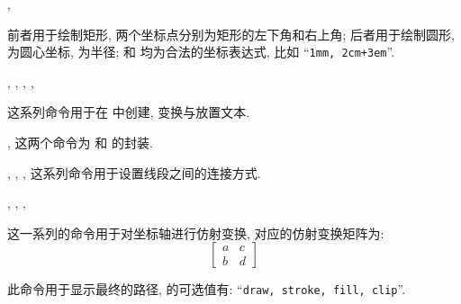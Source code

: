 \documentclass[
  hyper, lang=cn, 
  class=l3dox, 
]{../../zlatex/code/ztex}
\begin{document}
\begin{function}[added=2025-05-15]{\zrect, \zcirc}
  \begin{syntax}
  \end{syntax}
  前者用于绘制矩形, 两个坐标点分别为矩形的左下角和右上角; 后者用于绘制圆形,  为圆心坐标,  为半径;
   和  均为合法的坐标表达式, 比如 ``\texttt{1mm, 2cm+3em}''.
\end{function}


\begin{function}[added=2025-05-15]{\znewtext, \zsethtext, \zsetvtext, \zscaletext, \zputtext}
  \begin{syntax}
  \end{syntax}
  这系列命令用于在  中创建, 变换与放置文本.
\end{function}


\begin{function}[added=2025-05-15]{\zbg, \zeg}
  这两个命令为  和  的封装.
\end{function}



\begin{function}[added=2025-05-15]{\zcapbutt, \zcaproun, \zcaprect, \zclosepath}
  这系列命令用于设置线段之间的连接方式.
\end{function}


\begin{function}[added=2025-05-15]{\zshift, \zxscale, \zyscale, \ztrans}
  \begin{syntax}
  \end{syntax}
  这一系列的命令用于对坐标轴进行仿射变换,  对应的仿射变换矩阵为:
  \[\begin{bmatrix}
    a & c\\
    b & d
  \end{bmatrix}\]
\end{function}


\begin{function}[added=2025-05-15]{\usepath}
  \begin{syntax}
  \end{syntax}
  此命令用于显示最终的路径,  的可选值有: ``\texttt{draw, stroke, fill, clip}''.
\end{function}
\end{document}
